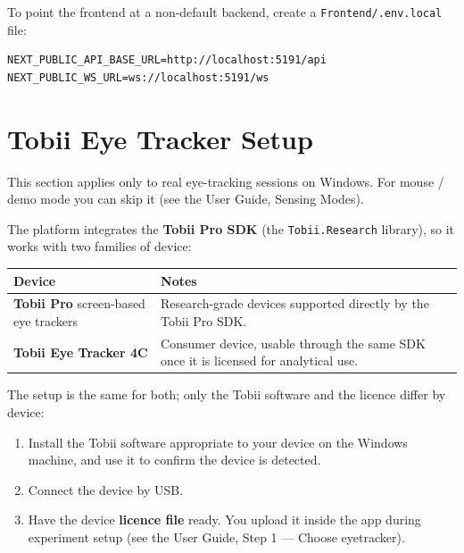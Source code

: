 To point the frontend at a non-default backend, create a \texttt{Frontend/.env.local} file:

\begin{Verbatim}[breaklines=true,breakanywhere=true,fontsize=\small]
NEXT_PUBLIC_API_BASE_URL=http://localhost:5191/api
NEXT_PUBLIC_WS_URL=ws://localhost:5191/ws
\end{Verbatim}

\FloatBarrier
\section{Tobii Eye Tracker Setup}\label{6-tobii-eye-tracker-setup}

This section applies only to real eye-tracking sessions on Windows. For mouse / demo mode you can
skip it (see the User Guide, Sensing Modes).

The platform integrates the \textbf{Tobii Pro SDK} (the \texttt{Tobii.Research} library), so it works with two
families of device:

{\small{} %
\begin{longtable}[]{@{}
  >{\raggedright\arraybackslash}p{}
  >{\raggedright\arraybackslash}p{}@{}}
\toprule\noalign{}
\begin{minipage}[b]{\linewidth}\raggedright
Device
\end{minipage} & \begin{minipage}[b]{\linewidth}\raggedright
Notes
\end{minipage} \\
\midrule\noalign{}
\endhead
\bottomrule\noalign{}
\endlastfoot
\textbf{Tobii Pro} screen-based eye trackers & Research-grade devices supported directly by the Tobii Pro SDK. \\
\textbf{Tobii Eye Tracker 4C} & Consumer device, usable through the same SDK once it is licensed for analytical use. \\
\end{longtable}
}

The setup is the same for both; only the Tobii software and the licence differ by device:

\begin{enumerate}
\def\labelenumi{\arabic{enumi}.}
\tightlist
\item
  Install the Tobii software appropriate to your device on the Windows machine, and use it to
  confirm the device is detected.
\item
  Connect the device by USB.
\item
  Have the device \textbf{licence file} ready. You upload it inside the app during experiment setup
  (see the User Guide, Step 1 --- Choose eyetracker).
\end{enumerate}


